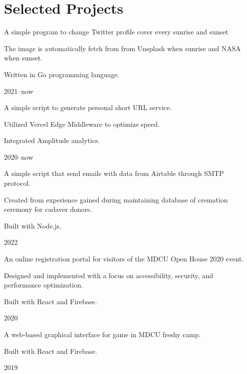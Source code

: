 \documentclass{cv}
\begin{document}
\section{Selected Projects}
\begin{cv_table}
  {\begin{cv_itemize}
      \item A simple program to change Twitter profile cover every sunrise and sunset
      \item The image is automatically fetch from from Unsplash when sunrise and NASA when sunset.
      \item Written in Go programming language.
    \end{cv_itemize}
  }{}{2021--now}
  {\begin{cv_itemize}
      \item A simple script to generate personal short URL service.
      \item Utilized Vercel Edge Middleware to optimize speed.
      \item Integrated Amplitude analytics.
    \end{cv_itemize}
  }{}{2020--now}
  {\begin{cv_itemize}
      \item A simple script that send emails with data from Airtable through SMTP protocol.
      \item Created from experience gained during maintaining database of cremation ceremony for cadaver donors.
      \item Built with Node.js.
    \end{cv_itemize}
  }{}{2022}
  {\begin{cv_itemize}
      \item An online registration portal for visitors of the MDCU Open House 2020 event.
      \item Designed and implemented with a focus on accessibility, security, and performance optimization.
      \item Built with React and Firebase.
    \end{cv_itemize}
  }{}{2020}
  {\begin{cv_itemize}
      \item A web-based graphical interface for game in MDCU freshy camp.
      \item Built with React and Firebase.
    \end{cv_itemize}
  }{}{2019}
\end{cv_table}
\end{document}
